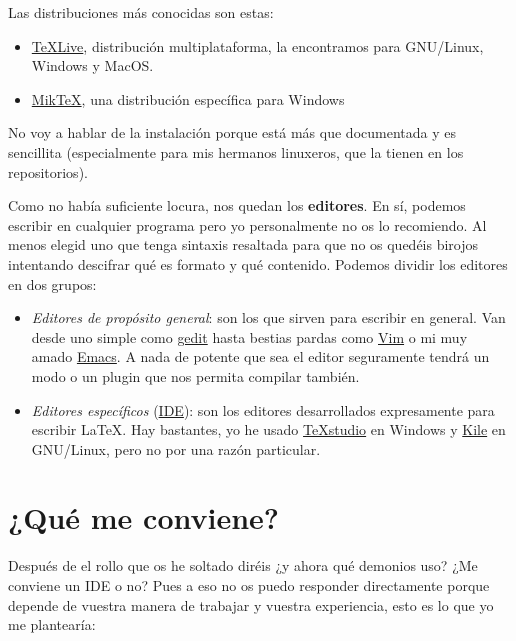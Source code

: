 Las distribuciones más conocidas son estas:

\begin{itemize}
\item
  \href{http://www.tug.org/texlive/}{TeXLive}, distribución
  multiplataforma, la encontramos para GNU/Linux, Windows y MacOS.
\item
  \href{https://miktex.org/}{MikTeX}, una distribución específica para
  Windows
\end{itemize}

No voy a hablar de la instalación porque está más que documentada y es
sencillita (especialmente para mis hermanos linuxeros, que la tienen en
los repositorios).

Como no había suficiente locura, nos quedan los \textbf{editores}. En
sí, podemos escribir en cualquier programa pero yo personalmente no os
lo recomiendo. Al menos elegid uno que tenga sintaxis resaltada para que
no os quedéis birojos intentando descifrar qué es formato y qué
contenido. Podemos dividir los editores en dos grupos:

\begin{itemize}
\item
  \emph{Editores de propósito general}: son los que sirven para escribir
  en general. Van desde uno simple como
  \href{https://es.wikipedia.org/wiki/Gedit}{gedit} hasta bestias pardas
  como \href{http://www.vim.org/}{Vim} o mi muy amado
  \href{https://www.gnu.org/software/emacs/}{Emacs}. A nada de potente
  que sea el editor seguramente tendrá un modo o un plugin que nos
  permita compilar también.
\item
  \emph{Editores específicos}
  (\href{https://es.wikipedia.org/wiki/Entorno_de_desarrollo_integrado}{IDE}):
  son los editores desarrollados expresamente para escribir LaTeX. Hay
  bastantes, yo he usado
  \href{http://texstudio.sourceforge.net/}{TeXstudio} en Windows y
  \href{http://kile.sourceforge.net/}{Kile} en GNU/Linux, pero no por
  una razón particular.
\end{itemize}

\section{¿Qué me conviene?}\label{quuxe9-me-conviene}

Después de el rollo que os he soltado diréis ¿y ahora qué demonios uso?
¿Me conviene un IDE o no? Pues a eso no os puedo responder directamente
porque depende de vuestra manera de trabajar y vuestra experiencia, esto
es lo que yo me plantearía:

